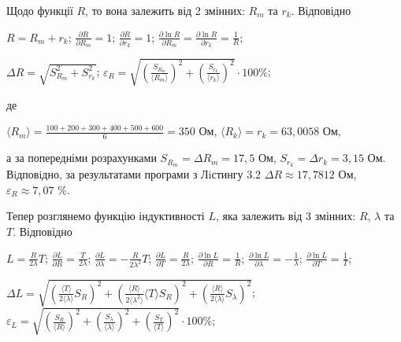 \documentclass[12pt,a4paper]{article}
\begin{document}
    Щодо функції $R$, то вона залежить від 2 змінних: $R_m$ та $r_k$. Відповідно

    \begin{center}
        $\displaystyle R = R_m + r_k$; $\displaystyle \frac{\partial R}{\partial R_m} = 1$; $\displaystyle \frac{\partial R}{\partial r_k} = 1$;
        $\displaystyle \frac{\partial \ln R}{\partial R_m} = \frac{\partial \ln R}{\partial r_k} = \frac{1}{R}$;
    \end{center}

    \begin{center}
        $\displaystyle \Delta R = \sqrt{S_{R_m}^2 + S_{r_k}^2}$;
        $\displaystyle \varepsilon_R = \sqrt{\left( \frac{S_{R_m}}{\text{⟨}R_m\text{⟩}} \right)^2 + \left( \frac{S_{r_k}}{\text{⟨}r_k\text{⟩}} \right)^2} \cdot 100 \%$;
    \end{center}

    де

    \begin{center}

        $\displaystyle \text{⟨}R_m\text{⟩} = \frac{100+200+300+400+500+600}{6} = 350$ Ом, $\text{⟨}R_k\text{⟩} = r_k = 63,0058$ Ом,

    \end{center}

    а за попередніми розрахунками $S_{R_m} = \Delta R_m = 17,5$ Ом, $S_{r_k} = \Delta r_k = 3,15$ Ом. Вiдповiдно, за результатами
    програми з Лiстингу 3.2 $\Delta R \approx 17,7812$ Ом, $\varepsilon_R \approx 7,07$ \%.

    Тепер розглянемо функцію індуктивності $L$, яка залежить від 3 змінних: $R$, $\lambda$ та $T$. Відповідно

    \begin{center}

        $\displaystyle L = \frac{R}{2\lambda}T$; $\displaystyle \frac{\partial L}{\partial R} = \frac{T}{2\lambda}$; $\displaystyle \frac{\partial L}{\partial \lambda} = -\frac{R}{2\lambda^2}T$; $\displaystyle \frac{\partial L}{\partial T} = \frac{R}{2\lambda}$;
        $\displaystyle \frac{\partial \ln L}{\partial R} = \frac{1}{R}$; $\displaystyle \frac{\partial \ln L}{\partial \lambda} = -\frac{1}{\lambda}$; $\displaystyle \frac{\partial \ln L}{\partial T} = \frac{1}{T}$;

    \end{center}

    \begin{center}

        $\displaystyle \Delta L = \sqrt{\left( \frac{\text{⟨}T\text{⟩}}{2\text{⟨}\lambda\text{⟩}} S_{R} \right)^2 + \left( \frac{\text{⟨}R\text{⟩}}{2\text{⟨}\lambda^2\text{⟩}} \text{⟨}T\text{⟩} S_{R}\right)^2 + \left( \frac{\text{⟨}R\text{⟩}}{2\text{⟨}\lambda\text{⟩}} S_{\lambda} \right)^2}$;
        $\displaystyle \varepsilon_L = \sqrt{\left( \frac{S_{R}}{\text{⟨}R\text{⟩}} \right)^2 + \left( \frac{S_{\lambda}}{\text{⟨}\lambda\text{⟩}} \right)^2 + \left( \frac{S_{T}}{\text{⟨}T\text{⟩}} \right)^2} \cdot 100 \%$;

    \end{center}
\end{document}
